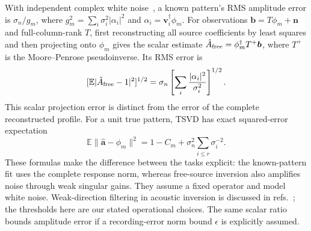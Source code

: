 \documentclass[pdflatex,sn-nature]{sn-jnl}%
\begin{document}
With independent complex white noise~\cite{schreier2010}, a known pattern's RMS amplitude
error is $\sigma_n/g_m$, where
$g_m^2=\sum_i\sigma_i^2|\alpha_i|^2$ and $\alpha_i=\bm v_i^\dagger\phi_m$.
For observations $\bm b=T\phi_m+\bm n$ and full-column-rank $T$, first reconstructing all source coefficients by least squares and then projecting onto $\phi_m$ gives the scalar estimate $\hat A_{\rm free}=\phi_m^\dagger T^+\bm b$, where $T^+$ is the Moore--Penrose pseudoinverse. Its RMS error is
\[
 [\mathbb E|\hat A_{\rm free}-1|^2]^{1/2}
 =\sigma_n\left[\sum_i\frac{|\alpha_i|^2}{\sigma_i^2}\right]^{1/2}.
\]
This scalar projection error is distinct from the error of the complete reconstructed profile.
For a unit true pattern, TSVD has exact squared-error expectation
\begin{equation}
 \mathbb E\|\hat{\bm a}-\phi_m\|^2
 =1-C_m+\sigma_n^2\sum_{i\le r}\sigma_i^{-2}.
 \label{eq:tsvd_error}
\end{equation}
These formulas make the difference between the tasks explicit: the known-pattern fit uses the complete response norm, whereas free-source inversion also amplifies noise through weak singular gains. They assume a fixed operator and model white noise.
Weak-direction filtering in acoustic inversion is discussed in refs.~\cite{williams2001,tanter2000,hansen2010}; the thresholds here are our stated operational choices.
The same scalar ratio bounds amplitude error if a recording-error norm
bound $\epsilon$ is explicitly assumed.
\end{document}
